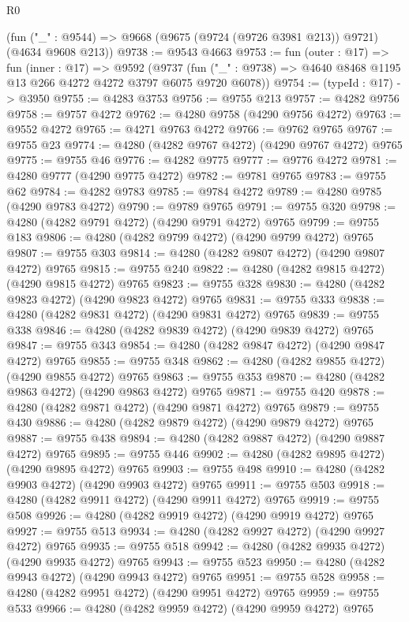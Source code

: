 \begin{lexlean}{R0}
\begin{coremodule}
    (fun ("_" : @9544) => @9668 (@9675 (@9724 (@9726 @3981 @213)) @9721) (@4634 @9608 @213))
@9738 := @9543 @4663
@9753 := fun (outer : @17) =>
  fun (inner : @17) =>
  @9592
    (@9737 (fun ("_" : @9738) => @4640 @8468 @1195 @13 @266 @4272 @4272 @3797 @6075 @9720 @6078))
@9754 := (typeId : @17) -> @3950
@9755 := @4283 @3753
@9756 := @9755 @213
@9757 := @4282 @9756
@9758 := @9757 @4272
@9762 := @4280 @9758 (@4290 @9756 @4272)
@9763 := @9552 @4272
@9765 := @4271 @9763 @4272
@9766 := @9762 @9765
@9767 := @9755 @23
@9774 := @4280 (@4282 @9767 @4272) (@4290 @9767 @4272) @9765
@9775 := @9755 @46
@9776 := @4282 @9775
@9777 := @9776 @4272
@9781 := @4280 @9777 (@4290 @9775 @4272)
@9782 := @9781 @9765
@9783 := @9755 @62
@9784 := @4282 @9783
@9785 := @9784 @4272
@9789 := @4280 @9785 (@4290 @9783 @4272)
@9790 := @9789 @9765
@9791 := @9755 @320
@9798 := @4280 (@4282 @9791 @4272) (@4290 @9791 @4272) @9765
@9799 := @9755 @183
@9806 := @4280 (@4282 @9799 @4272) (@4290 @9799 @4272) @9765
@9807 := @9755 @303
@9814 := @4280 (@4282 @9807 @4272) (@4290 @9807 @4272) @9765
@9815 := @9755 @240
@9822 := @4280 (@4282 @9815 @4272) (@4290 @9815 @4272) @9765
@9823 := @9755 @328
@9830 := @4280 (@4282 @9823 @4272) (@4290 @9823 @4272) @9765
@9831 := @9755 @333
@9838 := @4280 (@4282 @9831 @4272) (@4290 @9831 @4272) @9765
@9839 := @9755 @338
@9846 := @4280 (@4282 @9839 @4272) (@4290 @9839 @4272) @9765
@9847 := @9755 @343
@9854 := @4280 (@4282 @9847 @4272) (@4290 @9847 @4272) @9765
@9855 := @9755 @348
@9862 := @4280 (@4282 @9855 @4272) (@4290 @9855 @4272) @9765
@9863 := @9755 @353
@9870 := @4280 (@4282 @9863 @4272) (@4290 @9863 @4272) @9765
@9871 := @9755 @420
@9878 := @4280 (@4282 @9871 @4272) (@4290 @9871 @4272) @9765
@9879 := @9755 @430
@9886 := @4280 (@4282 @9879 @4272) (@4290 @9879 @4272) @9765
@9887 := @9755 @438
@9894 := @4280 (@4282 @9887 @4272) (@4290 @9887 @4272) @9765
@9895 := @9755 @446
@9902 := @4280 (@4282 @9895 @4272) (@4290 @9895 @4272) @9765
@9903 := @9755 @498
@9910 := @4280 (@4282 @9903 @4272) (@4290 @9903 @4272) @9765
@9911 := @9755 @503
@9918 := @4280 (@4282 @9911 @4272) (@4290 @9911 @4272) @9765
@9919 := @9755 @508
@9926 := @4280 (@4282 @9919 @4272) (@4290 @9919 @4272) @9765
@9927 := @9755 @513
@9934 := @4280 (@4282 @9927 @4272) (@4290 @9927 @4272) @9765
@9935 := @9755 @518
@9942 := @4280 (@4282 @9935 @4272) (@4290 @9935 @4272) @9765
@9943 := @9755 @523
@9950 := @4280 (@4282 @9943 @4272) (@4290 @9943 @4272) @9765
@9951 := @9755 @528
@9958 := @4280 (@4282 @9951 @4272) (@4290 @9951 @4272) @9765
@9959 := @9755 @533
@9966 := @4280 (@4282 @9959 @4272) (@4290 @9959 @4272) @9765

\end{coremodule}
\end{lexlean}
